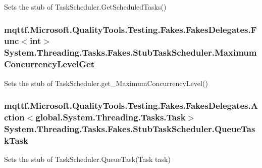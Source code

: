 Sets the stub of Task\-Scheduler.\-Get\-Scheduled\-Tasks()

\hypertarget{class_system_1_1_threading_1_1_tasks_1_1_fakes_1_1_stub_task_scheduler_aa2d1d323292e73e45cc57ee0fa9d1c05}{
\subsubsection[{Maximum\-Concurrency\-Level\-Get}]{\setlength{\rightskip}{0pt plus 5cm}mqttf.\-Microsoft.\-Quality\-Tools.\-Testing.\-Fakes.\-Fakes\-Delegates.\-Func$<$int$>$ System.\-Threading.\-Tasks.\-Fakes.\-Stub\-Task\-Scheduler.\-Maximum\-Concurrency\-Level\-Get}}\label{class_system_1_1_threading_1_1_tasks_1_1_fakes_1_1_stub_task_scheduler_aa2d1d323292e73e45cc57ee0fa9d1c05}


Sets the stub of Task\-Scheduler.\-get\-\_\-\-Maximum\-Concurrency\-Level()

\hypertarget{class_system_1_1_threading_1_1_tasks_1_1_fakes_1_1_stub_task_scheduler_a0066d6709fa645a32120e1fca61a2f5e}{
\subsubsection[{Queue\-Task\-Task}]{\setlength{\rightskip}{0pt plus 5cm}mqttf.\-Microsoft.\-Quality\-Tools.\-Testing.\-Fakes.\-Fakes\-Delegates.\-Action$<$global.\-System.\-Threading.\-Tasks.\-Task$>$ System.\-Threading.\-Tasks.\-Fakes.\-Stub\-Task\-Scheduler.\-Queue\-Task\-Task}}\label{class_system_1_1_threading_1_1_tasks_1_1_fakes_1_1_stub_task_scheduler_a0066d6709fa645a32120e1fca61a2f5e}


Sets the stub of Task\-Scheduler.\-Queue\-Task(\-Task task)

